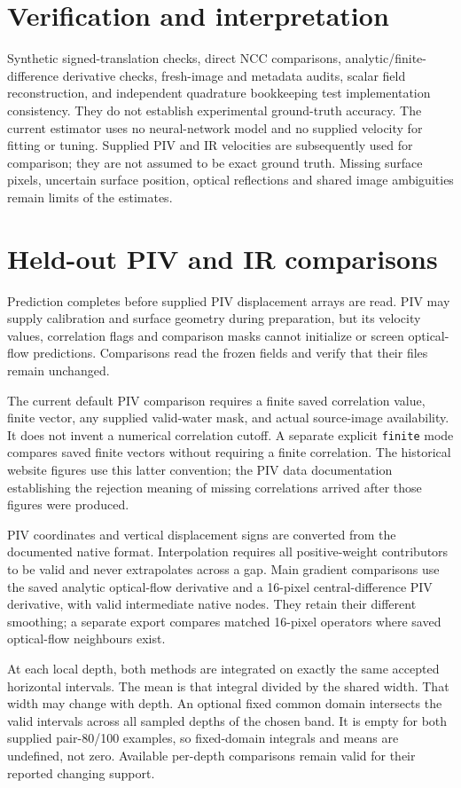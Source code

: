 \documentclass[11pt]{article}
\begin{document}
\section{Verification and interpretation}
Synthetic signed-translation checks, direct NCC comparisons, analytic/finite-difference derivative checks, fresh-image and metadata audits, scalar field reconstruction, and independent quadrature bookkeeping test implementation consistency. They do not establish experimental ground-truth accuracy. The current estimator uses no neural-network model and no supplied velocity for fitting or tuning. Supplied PIV and IR velocities are subsequently used for comparison; they are not assumed to be exact ground truth. Missing surface pixels, uncertain surface position, optical reflections and shared image ambiguities remain limits of the estimates.

\section{Held-out PIV and IR comparisons}
Prediction completes before supplied PIV displacement arrays are read. PIV may supply calibration and surface geometry during preparation, but its velocity values, correlation flags and comparison masks cannot initialize or screen optical-flow predictions. Comparisons read the frozen fields and verify that their files remain unchanged.

The current default PIV comparison requires a finite saved correlation value, finite vector, any supplied valid-water mask, and actual source-image availability. It does not invent a numerical correlation cutoff. A separate explicit \texttt{finite} mode compares saved finite vectors without requiring a finite correlation. The historical website figures use this latter convention; the PIV data documentation establishing the rejection meaning of missing correlations arrived after those figures were produced.

PIV coordinates and vertical displacement signs are converted from the documented native format. Interpolation requires all positive-weight contributors to be valid and never extrapolates across a gap. Main gradient comparisons use the saved analytic optical-flow derivative and a 16-pixel central-difference PIV derivative, with valid intermediate native nodes. They retain their different smoothing; a separate export compares matched 16-pixel operators where saved optical-flow neighbours exist.

At each local depth, both methods are integrated on exactly the same accepted horizontal intervals. The mean is that integral divided by the shared width. That width may change with depth. An optional fixed common domain intersects the valid intervals across all sampled depths of the chosen band. It is empty for both supplied pair-80/100 examples, so fixed-domain integrals and means are undefined, not zero. Available per-depth comparisons remain valid for their reported changing support.
\end{document}
